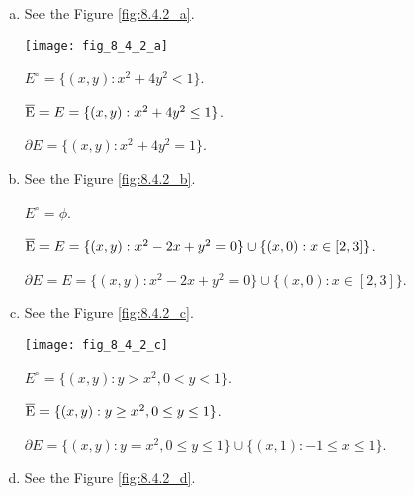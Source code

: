 \begin{Exercise}
\begin{enumerate}[a)]
\item
\begin{sketch} 
See the Figure \ref{fig:8.4.2_a}.

\begin{minipage}[h]{0.9\textwidth}
\centering
\texttt{[image: fig\_8\_4\_2\_a]}
\label{fig:8.4.2_a}
\end{minipage}

$E^\circ = \{(x,y):x^2+4y^2< 1\}$.

$\overline{\rm E} = E = \{(x,y):x^2+4y^2 \leq 1\}$.

$\partial E = \{(x,y):x^2+4y^2 = 1\}$.
\end{sketch}

\item
\begin{sketch} 
See the Figure \ref{fig:8.4.2_b}.

\begin{minipage}[h]{0.9\textwidth}
\centering

\label{fig:8.4.2_b}
\end{minipage}

$E^\circ = \phi$.

$\overline{\rm E} = E = \{(x,y):x^2-2x+y^2=0\}\cup\{(x,0):x\in[2,3]\}$.

$\partial E = E = \{(x,y):x^2-2x+y^2=0\}\cup\{(x,0):x\in[2,3]\}$.
\end{sketch}

\item
\begin{sketch} 
See the Figure \ref{fig:8.4.2_c}.

\begin{minipage}[h]{0.9\textwidth}
\centering
\texttt{[image: fig\_8\_4\_2\_c]}
\label{fig:8.4.2_c}
\end{minipage}

$E^\circ = \{(x,y):y>x^2,0<y<1\}$.

$\overline{\rm E} = \{(x,y):y\geq x^2, 0\leq y \leq 1\}$.

$\partial E = \{(x,y):y=x^2,0\leq y \leq 1\}\cup\{(x,1):-1\leq x\leq 1\}$.
\end{sketch}

\item
\begin{sketch} 
See the Figure \ref{fig:8.4.2_d}.


\end{sketch}
\end{enumerate}
\end{Exercise}
